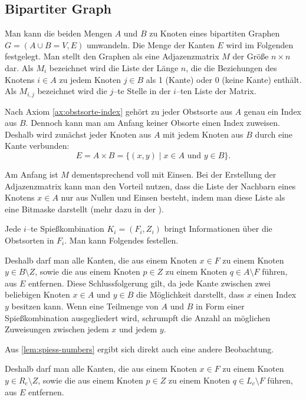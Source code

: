 \subsection{Bipartiter Graph}
Man kann die beiden Mengen $A$ und $B$ zu Knoten eines bipartiten Graphen $G = (A \cup B = V, E)$ umwandeln.
Die Menge der Kanten $E$ wird im Folgenden festgelegt.
Man stellt den Graphen als eine Adjazenzmatrix $M$ der Größe $n \times n$ dar. 
Als $M_i$ bezeichnet wird die Liste der Länge $n$,
die die Beziehungen des Knotens
$i \in A$ zu jedem Knoten $j \in B$ als 1 (Kante) oder 0 (keine Kante) enthält.
Als $M_{i, j}$ bezeichnet wird die $j$--te Stelle in der $i$--ten Liste der Matrix.

Nach Axiom \ref{ax:obstsorte-index} gehört zu jeder Obstsorte aus $A$ genau ein Index aus $B$.
Dennoch kann man am Anfang keiner Obsorte einen Index zuweisen.
Deshalb wird zunächst jeder Knoten aus $A$ mit jedem Knoten aus $B$ durch eine Kante verbunden:
\[
E = A\times B = \{(x, y) \mid  x \in A \text{ und } y \in B\}.
\]



Am Anfang ist $M$ dementsprechend voll mit Einsen.
Bei der Erstellung der Adjazenzmatrix kann man den Vorteil nutzen, dass die 
Liste der Nachbarn eines Knotens $x \in A$ nur aus Nullen und Einsen besteht, indem man
diese Liste als eine Bitmaske darstellt (mehr dazu in der ).

Jede $i$--te Spießkombination $K_i = (F_i, Z_i)$ bringt Informationen über die Obstsorten in $F_i$.
Man kann Folgendes festellen. 



Deshalb darf man alle Kanten, die aus einem Knoten $x \in F$ 
zu einem Knoten $y \in B \setminus Z$, sowie die aus einem Knoten $p \in Z$ zu
einem Knoten $q \in A \setminus F$ führen, aus $E$ entfernen.
Diese Schlussfolgerung gilt, da %
jede Kante zwischen zwei beliebigen Knoten $x \in A$ und $y \in B$ die Möglichkeit darstellt,
dass $x$ einen Index $y$ besitzen kann.
Wenn eine Teilmenge von $A$ und $B$ in Form einer Spießkombination ausgegliedert wird,
schrumpft die Anzahl an möglichen Zuweisungen zwischen jedem $x$ und jedem $y$. 




\noindent Aus \cref{lem:spiess-numbers} ergibt sich direkt auch eine andere Beobachtung.



Deshalb darf man alle Kanten, die aus einem Knoten $x \in F$ 
zu einem Knoten $y \in R_c \setminus Z$, sowie die aus einem Knoten $p \in Z$ 
zu einem Knoten $q \in L_c \setminus F$ führen, aus $E$ entfernen.

